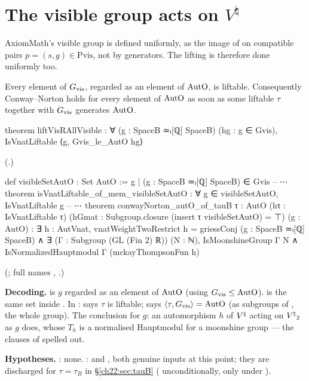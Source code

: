 \section{The visible group acts on \texorpdfstring{$V^\natural$}{V-natural}}\label{ch22:sec:visible}

AxiomMath's visible group is defined uniformly, as the image of  on compatible pairs
$p=(s,g)\in\mathrm{Pvis}$, not by generators.  The lifting is therefore done uniformly too.

\begin{theorem}\label{ch22:thm:visible}
Every element of $G_{\mathrm{vis}}$, regarded as an element of $\mathrm{AutO}$, is liftable.  Consequently
Conway--Norton holds for every element of $\mathrm{AutO}$ as soon as some liftable $\tau$ together with
$G_{\mathrm{vis}}$ generates $\mathrm{AutO}$.
\end{theorem}
\begin{leancode}
theorem liftVisRAllVisible : ∀ (g : SpaceB ≃ₗ[ℚ] SpaceB) (hg : g ∈ Gvis),
    IsVnatLiftable ⟨g, Gvis_le_AutO hg⟩
\end{leancode}
(.)
\begin{leancode}
def visibleSetAutO : Set AutO := {g | (g : SpaceB ≃ₗ[ℚ] SpaceB) ∈ Gvis}
-- ⋯
theorem isVnatLiftable_of_mem_visibleSetAutO : ∀ g ∈ visibleSetAutO, IsVnatLiftable g
-- ⋯
theorem conwayNorton_autO_of_tauB {τ : AutO} (hτ : IsVnatLiftable τ)
    (hGmat : Subgroup.closure (insert τ visibleSetAutO) = ⊤) (g : AutO) :
    ∃ h : AutVnat, vnatWeightTwoRestrict h = griessConj (g : SpaceB ≃ₗ[ℚ] SpaceB) ∧
      ∃ (Γ : Subgroup (GL (Fin 2) ℝ)) (N : ℕ), IsMoonshineGroup Γ N ∧
        IsNormalizedHauptmodul Γ (mckayThompsonFun h)
\end{leancode}
(; full names ,
.)
\begin{dictionary}
\textbf{Decoding.}   is $g$ regarded as an element of $\mathrm{AutO}$ (using
$G_{\mathrm{vis}}\le\mathrm{AutO}$).   is the same set inside .  In
:  says $\tau$ is liftable;  says
$\langle\tau,G_{\mathrm{vis}}\rangle=\mathrm{AutO}$ (as subgroups of ,  the whole group).  The
conclusion for $g$: an automorphism $h$ of ${V^{\natural}}$ acting on ${V^{\natural}}_2$ as $g$ does, whose $T_h$ is a normalised
Hauptmodul for a moonshine group --- the clauses of  spelled out.

\textbf{Hypotheses.}  : none.  :  and
, both genuine inputs at this point; they are discharged for $\tau=\tau_B$ in \S\ref{ch22:sec:tauB}
( unconditionally,  only under ).
\end{dictionary}
